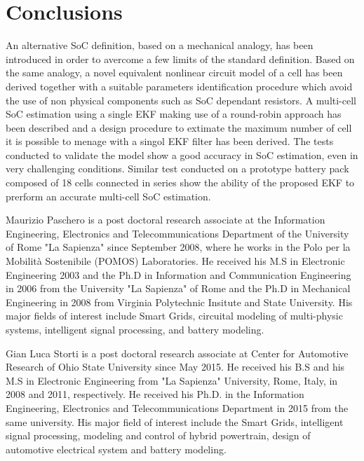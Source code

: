 \documentclass[journal]{IEEEtran}
\begin{document}
\section{Conclusions}
\label{sec::conclusion}
An alternative SoC definition, based on a mechanical analogy, has been introduced in order to avercome a few limits of the standard definition. Based on the same analogy, a novel equivalent nonlinear circuit model of a cell has been derived together with a suitable parameters identification procedure which avoid the use of non physical components such as SoC dependant resistors. A multi-cell SoC estimation using a single EKF making use of a round-robin approach has been described and a design procedure to extimate the maximum number of cell it is possible to menage with a singol EKF filter has been derived. The tests conducted to validate the model show a good accuracy in SoC estimation, even in very challenging conditions. Similar test conducted on a prototype battery pack composed of 18 cells connected in series show the ability of the proposed EKF to prerform an accurate multi-cell SoC estimation. 


\begin{IEEEbiography}[{\texttt{[image: MP]}}]{Maurizio Paschero}  is a post doctoral research associate at the Information Engineering, Electronics and Telecommunications Department of the University of Rome "La Sapienza" since September 2008, where he works in the Polo per la Mobilit\`{a} Sostenibile (POMOS) Laboratories.
He received his M.S in Electronic Engineering 2003 and the Ph.D in Information and Communication Engineering in 2006 from the University "La Sapienza" of Rome and the Ph.D in Mechanical Engineering in 2008 from Virginia Polytechnic Insitute and State University.
His major fields of interest include Smart Grids, circuital modeling of multi-physic systems, intelligent signal processing, and battery modeling.
\end{IEEEbiography}
\begin{IEEEbiography}{Gian Luca Storti} is a post doctoral research associate at Center for Automotive Research of Ohio State University since May 2015.
He received his B.S and his M.S in Electronic Engineering from "La Sapienza" University, Rome, Italy, in 2008 and 2011, respectively.
He received his Ph.D. in the Information Engineering, Electronics 
and Telecommunications Department in 2015 from the same university.
His major field of interest include the Smart Grids, intelligent signal processing, modeling and control 
of hybrid powertrain, design of automotive electrical system and battery modeling.
\end{IEEEbiography}
\end{document}
